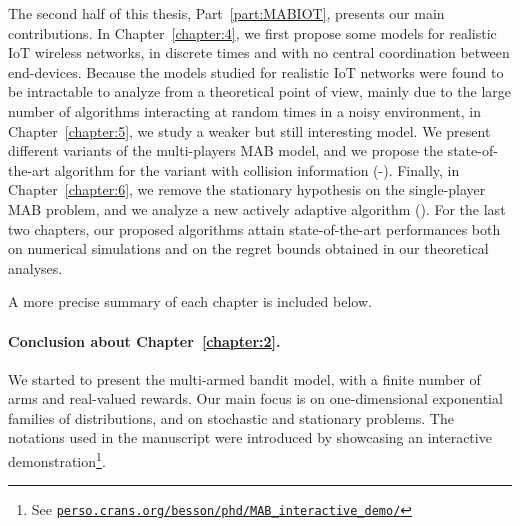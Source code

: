 The second half of this thesis, Part~\ref{part:MABIOT}, presents our main contributions.
In Chapter~\ref{chapter:4}, we first propose some models for realistic IoT wireless networks, in discrete times and with no central coordination between end-devices.
Because the models studied for realistic IoT networks were found to be intractable to analyze from a theoretical point of view, mainly due to the large number of algorithms interacting at random times in a noisy environment,
in Chapter~\ref{chapter:5}, we study a weaker but still interesting model.
We present different variants of the multi-players MAB model, and we propose the state-of-the-art algorithm for the variant with collision information (\MCTopM-\klUCB).
Finally, in Chapter~\ref{chapter:6}, we remove the stationary hypothesis on the single-player MAB problem, and we analyze a new actively adaptive algorithm (\GLRklUCB).
%
For the last two chapters, our proposed algorithms attain state-of-the-art performances both on numerical simulations and on the regret bounds obtained in our theoretical analyses.

A more precise summary of each chapter is included below.




\paragraph{Conclusion about \textbf{Chapter~\ref{chapter:2}}.}

We started to present the multi-armed bandit model, with a finite number of arms and real-valued rewards.
Our main focus is on one-dimensional exponential families of distributions, and on stochastic and stationary problems.
The notations used in the manuscript were introduced by showcasing an interactive demonstration\footnote{See \href{https://perso.crans.org/besson/phd/MAB\_interactive\_demo/}{\texttt{perso.crans.org/besson/phd/MAB\_interactive\_demo/}}}.

